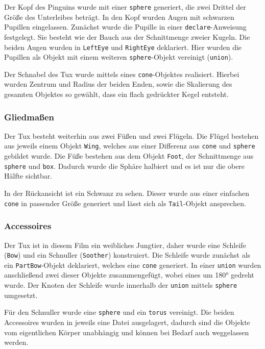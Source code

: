 \documentclass[11pt,parskip]{scrartcl}
\begin{document}
Der Kopf des Pinguins wurde mit einer \texttt{sphere} generiert, die zwei
Drittel der Größe des Unterleibes beträgt. In den Kopf wurden Augen mit
schwarzen Pupillen eingelassen. Zunächst wurde die Pupille in einer
\texttt{declare}-Anweisung festgelegt. Sie besteht wie der Bauch aus der
Schnittmenge zweier Kugeln. Die beiden Augen wurden in \texttt{LeftEye} und
\texttt{RightEye} deklariert. Hier wurden die Pupillen als Objekt mit einem
weiteren \texttt{sphere}-Objekt vereinigt (\texttt{union}).

Der Schnabel des Tux wurde mittels eines \texttt{cone}-Objektes realisiert.
Hierbei wurden Zentrum und Radius der beiden Enden, sowie die Skalierung des
gesamten Objektes so gewählt, dass ein flach gedrückter Kegel entsteht.

\subsubsection{Gliedmaßen}
Der Tux besteht weiterhin aus zwei Füßen und zwei Flügeln. Die Flügel bestehen
aus jeweils einem Objekt \texttt{Wing}, welches aus einer Differenz aus
\texttt{cone} und \texttt{sphere} gebildet wurde. Die Füße bestehen aus dem
Objekt \texttt{Foot}, der Schnittmenge aus \texttt{sphere} und \texttt{box}.
Dadurch wurde die Sphäre halbiert und es ist nur die obere Hälfte sichtbar.

In der Rückansicht ist ein Schwanz zu sehen. Dieser wurde aus einer einfachen
\texttt{cone} in passender Größe generiert und lässt sich als
\texttt{Tail}-Objekt ansprechen.

\subsubsection{Accessoires}
Der Tux ist in diesem Film ein weibliches Jungtier, daher wurde eine Schleife
(\texttt{Bow}) und ein Schnuller (\texttt{Soother}) konstruiert. Die Schleife
wurde zunächst als ein \texttt{PartBow}-Objekt deklariert, welches eine
\texttt{cone} generiert. In einer \texttt{union} wurden anschließend zwei dieser
Objekte zusammengefügt, wobei eines um \ang{180} gedreht wurde. Der Knoten der
Schleife wurde innerhalb der \texttt{union} mittels \texttt{sphere} umgesetzt.

Für den Schnuller wurde eine \texttt{sphere} und ein \texttt{torus} vereinigt.
Die beiden Accessoires wurden in jeweils eine Datei ausgelagert, dadurch sind
die Objekte vom eigentlichen Körper unabhängig und können bei Bedarf auch
weggelassen werden.
\end{document}
